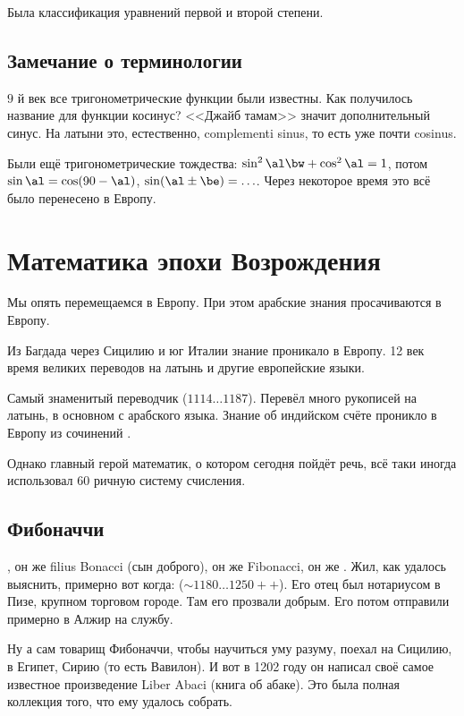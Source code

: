 \documentclass[a4paper,oneside,fleqn,10pt]{article}
\newcommand{\pe}[2]{${#1}\ldots{#2}$}
\begin{document}
Была классификация уравнений первой и второй степени.

\subsection{Замечание о терминологии}

$9$ й век все тригонометрические функции были известны. Как получилось
название для функции косинус?  <<Джайб тамам>> значит дополнительный
синус. На латыни это, естественно, complementi sinus, то есть уже
почти cosinus.

Были ещё тригонометрические тождества: $\sin^2 \al \bw+ \cos^2\al =
1$, потом $\sin \al = \cos(90-\al)$, $\sin({\al \pm\be}) = \ldots$.
Через некоторое время это всё было перенесено в Европу.


\section{Математика эпохи Возрождения}

Мы опять перемещаемся в Европу. При этом арабские знания просачиваются
в Европу.

Из Багдада через Сицилию и юг Италии знание проникало в Европу.  12
век время великих переводов на латынь и другие европейские языки.

Самый знаменитый переводчик 
(\pe{1114}{1187}).  Перевёл много рукописей на латынь, в основном с
арабского языка.  Знание об индийском счёте проникло в Европу из
сочинений .

Однако главный герой математик, о котором сегодня пойдёт речь, всё
таки иногда использовал 60 ричную систему счисления.

\subsection{Фибоначчи}

, он же filius Bonacci (сын доброго), он же
Fibonacci, он же . Жил, как удалось выяснить, примерно
вот когда: (\pe{\sim 1180}{1250{+}{+}}).  Его отец был нотариусом в
Пизе, крупном торговом городе.  Там его прозвали добрым. Его потом
отправили примерно в Алжир на службу.

Ну а сам товарищ Фибоначчи, чтобы научиться уму разуму, поехал на
Сицилию, в Египет, Сирию (то есть Вавилон).  И вот в 1202 году он
написал своё самое известное произведение Liber Abaci (книга об
абаке).  Это была полная коллекция того, что ему удалось собрать.
\end{document}

